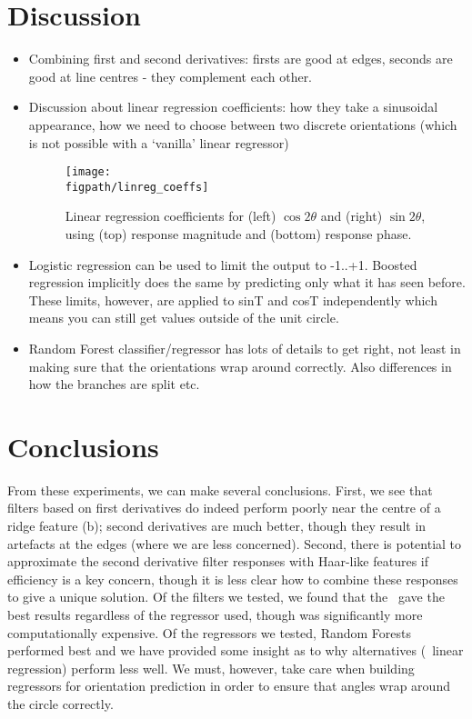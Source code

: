 \section{Discussion}
\label{s:discussion}
\begin{itemize}
\item Combining first and second derivatives: firsts are good at edges, seconds are good at line centres - they complement each other.

\item Discussion about linear regression coefficients: how they take a sinusoidal appearance, how we need to choose between two discrete orientations (which is not possible with a `vanilla' linear regressor)
%
\begin{figure}[t]
	\centering
		\texttt{[image: \\figpath/linreg\_coeffs]}
	\caption{Linear regression coefficients for (left) $\cos 2\theta$ and (right) $\sin 2\theta$, using (top) response magnitude and (bottom) response phase.}
	\label{f:linreg_coeffs}
\end{figure}

\item Logistic regression can be used to limit the output to -1..+1. Boosted regression implicitly does the same by predicting only what it has seen before. These limits, however, are applied to sinT and cosT independently which means you can still get values outside of the unit circle.

\item Random Forest classifier/regressor has lots of details to get right, not least in making sure that the orientations wrap around correctly. Also differences in how the branches are split etc.

\end{itemize}


\section{Conclusions}
\label{s:conclusions}
From these experiments, we can make several conclusions. First, we see that filters based on first derivatives do indeed perform poorly near the centre of a ridge feature (b); second derivatives are much better, though they result in artefacts at the edges (where we are less concerned). Second, there is potential to approximate the second derivative filter responses with Haar-like features if efficiency is a key concern, though it is less clear how to combine these responses to give a unique solution. Of the filters we tested, we found that the \dtcwt~gave the best results regardless of the regressor used, though was significantly more computationally expensive. Of the regressors we tested, Random Forests performed best and we have provided some insight as to why alternatives (\eg~linear regression) perform less well. We must, however, take care when building regressors for orientation prediction in order to ensure that angles wrap around the circle correctly.

